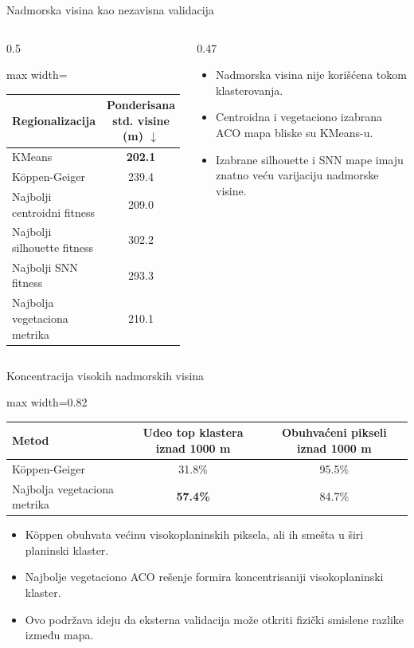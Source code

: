 \documentclass[aspectratio=169,10pt]{beamer}
\newcommand{\betterdown}{\(\downarrow\)}
\begin{document}
\begin{frame}{Nadmorska visina kao nezavisna validacija}
  \begin{columns}[T]
    \begin{column}{0.5\textwidth}
      \begin{adjustbox}{max width=\textwidth}
      \begin{tabular}{lc}
        \toprule
        Regionalizacija & Ponderisana std. visine (m) \betterdown \\
        \midrule
        KMeans & \textbf{202.1} \\
        K\"oppen-Geiger & 239.4 \\
        Najbolji centroidni fitness & 209.0 \\
        Najbolji silhouette fitness & 302.2 \\
        Najbolji SNN fitness & 293.3 \\
        Najbolja vegetaciona metrika & 210.1 \\
        \bottomrule
      \end{tabular}
      \end{adjustbox}
    \end{column}
    \begin{column}{0.47\textwidth}
      \begin{itemize}
        \item Nadmorska visina nije korišćena tokom klasterovanja.
        \item Centroidna i vegetaciono izabrana ACO mapa bliske su KMeans-u.
        \item Izabrane silhouette i SNN mape imaju znatno veću varijaciju nadmorske visine.
      \end{itemize}
    \end{column}
  \end{columns}
\end{frame}

\begin{frame}{Koncentracija visokih nadmorskih visina}
  \begin{adjustbox}{max width=0.82\textwidth}
  \begin{tabular}{lcc}
    \toprule
    Metod & Udeo top klastera iznad 1000 m & Obuhvaćeni pikseli iznad 1000 m \\
    \midrule
    K\"oppen-Geiger & 31.8\% & 95.5\% \\
    Najbolja vegetaciona metrika & \textbf{57.4\%} & 84.7\% \\
    \bottomrule
  \end{tabular}
  \end{adjustbox}

  \vspace{1em}
  \begin{itemize}
    \item K\"oppen obuhvata većinu visokoplaninskih piksela, ali ih smešta u širi planinski klaster.
    \item Najbolje vegetaciono ACO rešenje formira koncentrisaniji visokoplaninski klaster.
    \item Ovo podržava ideju da eksterna validacija može otkriti fizički smislene razlike između mapa.
  \end{itemize}
\end{frame}
\end{document}
